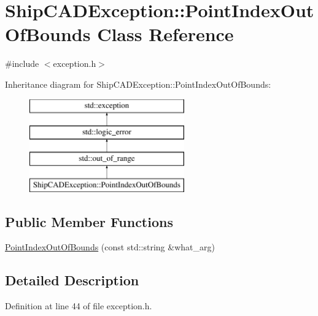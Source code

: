 \hypertarget{classShipCADException_1_1PointIndexOutOfBounds}{\section{Ship\-C\-A\-D\-Exception\-:\-:Point\-Index\-Out\-Of\-Bounds Class Reference}
\label{classShipCADException_1_1PointIndexOutOfBounds}
}


{\ttfamily \#include $<$exception.\-h$>$}

Inheritance diagram for Ship\-C\-A\-D\-Exception\-:\-:Point\-Index\-Out\-Of\-Bounds\-:\begin{figure}[H]
\begin{center}
\leavevmode
\includegraphics[height=4.000000cm]{classShipCADException_1_1PointIndexOutOfBounds}
\end{center}
\end{figure}
\subsection*{Public Member Functions}
\begin{DoxyCompactItemize}
\item 
\hyperlink{classShipCADException_1_1PointIndexOutOfBounds_aa9541484936b3d9fe243795cc9c03207}{Point\-Index\-Out\-Of\-Bounds} (const std\-::string \&what\-\_\-arg)
\end{DoxyCompactItemize}


\subsection{Detailed Description}


Definition at line 44 of file exception.\-h.




